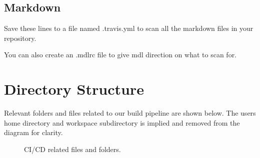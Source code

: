 \subsection{Markdown}
\justifying
Save these lines to a file named .travis.yml to scan all the markdown files in your
repository.

%	

\justifying
You can also create an .mdlrc file to give mdl direction on what to scan for.

%	

\clearpage

\section{Directory Structure}

\justifying
Relevant folders and files related to our build pipeline are shown below. The users
home directory
and workspace subdirectory is implied and removed from the diagram for clarity.

\begin{figure}[!htb]
	
	\caption{CI/CD related files and folders.}
\label{cicdfiles}
\end{figure}

